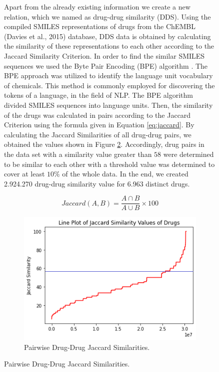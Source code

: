 \begin{figure}[h]
Apart from the already existing information we create a new relation, which we named as drug-drug similarity (DDS). Using the compiled SMILES representations of drugs from the ChEMBL (Davies et al., 2015) database, DDS data is obtained by calculating the similarity of these representations to each other according to the Jaccard Similarity Criterion. In order to find the similar SMILES sequences we used the Byte Pair Encoding (BPE) algorithm \cite{sennrich2015neural}. The BPE approach was utilized to identify the language unit vocabulary of chemicals. This method is commonly employed for discovering the tokens of a language, in the field of NLP. The BPE algorithm divided SMILES sequences into language units. Then, the similarity of the drugs was calculated in pairs according to the Jaccard Criterion using the formula given in Equation \ref{eq:jaccard}. By calculating the Jaccard Similarities of all drug-drug pairs, we obtained the values shown in Figure \ref{fig:dds}. Accordingly, drug pairs in the data set with a similarity value greater than $58$ were determined to be similar to each other with a threshold value was determined to cover at least $10\%$ of the whole data. In the end, we created 2.924.270 drug-drug similarity value for 6.963 distinct drugs.

\begin{equation}
    Jaccard (A, B) = \frac{A \cap  B}{ A \cup B} \times  100
\label{eq:jaccard}
\end{equation}

\begin{figure}
    \centering
        \includegraphics[width=0.5\linewidth]{chapters/materials_and_methods/figures/dds_line.png}
    \caption{Pairwise Drug-Drug Jaccard Similarities.}
    \label{fig:dds}
\end{figure}



\end{figure}
